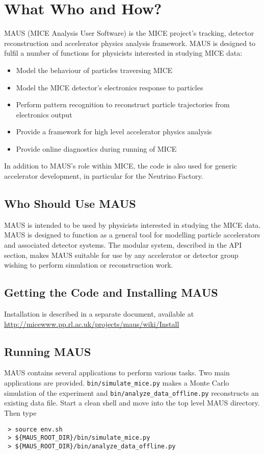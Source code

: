 \chapter{What Who and How?}
\label{chapter:introduction}
MAUS (MICE Analysis User Software) is the MICE project's tracking, detector reconstruction and accelerator physics analysis framework. MAUS is designed to fulfil a number of functions for physicists interested in studying MICE data:

\begin{itemize}
\item Model the behaviour of particles traversing MICE
\item Model the MICE detector's electronics response to particles
\item Perform pattern recognition to reconstruct particle trajectories from electronics output
\item Provide a framework for high level accelerator physics analysis
\item Provide online diagnostics during running of MICE
\end{itemize}

In addition to MAUS's role within MICE, the code is also used for generic accelerator development, in particular for the Neutrino Factory.

\section{Who Should Use MAUS}
MAUS is intended to be used by physicists interested in studying the MICE data. MAUS is designed to function as a general tool for modelling particle accelerators and associated detector systems. The modular system, described in the API section, makes MAUS suitable for use by any accelerator or detector group wishing to perform simulation or reconstruction work.

\section{Getting the Code and Installing MAUS}
Installation is described in a separate document, available at \url{http://micewww.pp.rl.ac.uk/projects/maus/wiki/Install}

\section{Running MAUS}
MAUS contains several applications to perform various tasks. Two main applications are provided. \verb|bin/simulate_mice.py| makes a Monte Carlo simulation of the experiment and \verb|bin/analyze_data_offline.py| reconstructs an existing data file. Start a clean shell and move into the top level MAUS directory. Then type
\begin{verbatim}
 > source env.sh
 > ${MAUS_ROOT_DIR}/bin/simulate_mice.py
 > ${MAUS_ROOT_DIR}/bin/analyze_data_offline.py
\end{verbatim}

